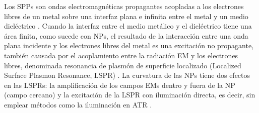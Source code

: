 Los SPPs son ondas electromagnéticas propagantes acopladas a los electrones libres de un metal sobre una interfaz plana e infinita entre el metal y un medio dieléctrico \cite{maier2007plasmonics}. Cuando la interfaz  entre el medio metálico y el dieléctrico tiene una área finita, como sucede con NPs, el resultado de la interacción entre una onda plana incidente y los electrones libres del metal es una excitación no propagante, también causada por el acoplamiento entre la radiación EM y los electrones libres, denominada resonancia de plasmón de superficie localizado (Localized Surface Plasmon Resonance, LSPR) \cite{maier2007plasmonics}. La curvatura de las NPs tiene dos efectos en las LSPRs: la amplificación de los campos EMs dentro y fuera de la NP  (campo cercano) y la excitación de la LSPR con iluminación directa, es decir, sin emplear métodos como la iluminación en ATR \cite{maier2007plasmonics}.

